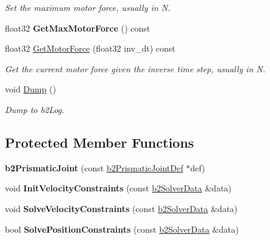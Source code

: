 \begin{DoxyCompactItemize}
\begin{DoxyCompactList}\small\item\em Set the maximum motor force, usually in N. \end{DoxyCompactList}\item 
float32 {\bfseries Get\+Max\+Motor\+Force} () const \hypertarget{classb2_prismatic_joint_a2d1583462dd6cb62d0a48353ddd48c42}{}\label{classb2_prismatic_joint_a2d1583462dd6cb62d0a48353ddd48c42}

\item 
float32 \hyperlink{classb2_prismatic_joint_aee80c02627750559fc382422804a30e6}{Get\+Motor\+Force} (float32 inv\+\_\+dt) const \hypertarget{classb2_prismatic_joint_aee80c02627750559fc382422804a30e6}{}\label{classb2_prismatic_joint_aee80c02627750559fc382422804a30e6}

\begin{DoxyCompactList}\small\item\em Get the current motor force given the inverse time step, usually in N. \end{DoxyCompactList}\item 
void \hyperlink{classb2_prismatic_joint_a1d8e01f0c7ca9e1840f1f17c17dda7db}{Dump} ()\hypertarget{classb2_prismatic_joint_a1d8e01f0c7ca9e1840f1f17c17dda7db}{}\label{classb2_prismatic_joint_a1d8e01f0c7ca9e1840f1f17c17dda7db}

\begin{DoxyCompactList}\small\item\em Dump to b2\+Log. \end{DoxyCompactList}\end{DoxyCompactItemize}
\subsection*{Protected Member Functions}
\begin{DoxyCompactItemize}
\item 
{\bfseries b2\+Prismatic\+Joint} (const \hyperlink{structb2_prismatic_joint_def}{b2\+Prismatic\+Joint\+Def} $\ast$def)\hypertarget{classb2_prismatic_joint_ab1586a2334f7e32137fbd7f807e249ca}{}\label{classb2_prismatic_joint_ab1586a2334f7e32137fbd7f807e249ca}

\item 
void {\bfseries Init\+Velocity\+Constraints} (const \hyperlink{structb2_solver_data}{b2\+Solver\+Data} \&data)\hypertarget{classb2_prismatic_joint_a2178262be18a40c1aca79375ce7f4e7f}{}\label{classb2_prismatic_joint_a2178262be18a40c1aca79375ce7f4e7f}

\item 
void {\bfseries Solve\+Velocity\+Constraints} (const \hyperlink{structb2_solver_data}{b2\+Solver\+Data} \&data)\hypertarget{classb2_prismatic_joint_a05f935314127028e3ee6c8816e178aa0}{}\label{classb2_prismatic_joint_a05f935314127028e3ee6c8816e178aa0}

\item 
bool {\bfseries Solve\+Position\+Constraints} (const \hyperlink{structb2_solver_data}{b2\+Solver\+Data} \&data)\hypertarget{classb2_prismatic_joint_a3ce2a793c1e92df1205e4a704997bbf6}{}\label{classb2_prismatic_joint_a3ce2a793c1e92df1205e4a704997bbf6}

\end{DoxyCompactItemize}
